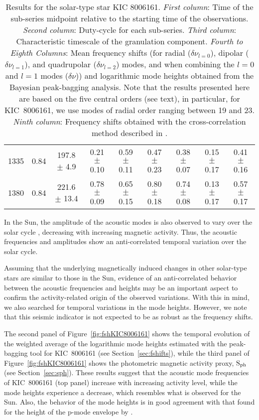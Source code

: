 \documentclass[twocolumn]{aastex61}%
\begin{document}
\begin{table*}
\begin{tabular}{ccc|ccccc|c}
1335 & 0.84 & 197.8 $\pm$ 4.9 & 0.21 $\pm$ 0.10 & 0.59 $\pm$ 0.11 & 0.47 $\pm$ 0.23 & 0.38 $\pm$ 0.07 & 0.15 $\pm$ 0.17 & 0.41 $\pm$ 0.16\\
1380 & 0.84 & 221.6 $\pm$ 13.4 & 0.78 $\pm$ 0.09 & 0.65 $\pm$ 0.15 & 0.80 $\pm$ 0.18 & 0.74 $\pm$ 0.08 & 0.13 $\pm$ 0.17 & 0.57 $\pm$ 0.17\\
\end{tabular}
\caption{Results for the solar-type star KIC 8006161. {\it First column}: Time of the sub-series midpoint relative to the starting time of the observations. {\it Second column}: Duty-cycle for each sub-series. {\it Third column}: Characteristic timescale of the granulation component. {\it Fourth to Eighth Columns}: Mean frequency shifts (for radial ($\delta\nu_{l=0}$), dipolar ($\delta\nu_{l=1}$), and quadrupolar ($\delta\nu_{l=2}$) modes, and when combining the $l=0$ and $l=1$ modes ($\delta\nu$)) and logarithmic mode heights obtained from the Bayesian peak-bagging analysis. Note that the results presented here are based on the five central orders (see text), in particular, for KIC~8006161, we use modes of radial order ranging between 19 and 23. {\it Ninth column}: Frequency shifts obtained with the cross-correlation method described in \citet{Kiefer2017}.}\label{tab:fshifts8006161}
\end{table*}

In the Sun, the amplitude of the acoustic modes is also observed to vary over the solar cycle \citep[e.g.][]{Elsworth1993,Chaplin2000,Salabert2006,Howe2015}, decreasing with increasing magnetic activity. Thus, the acoustic frequencies and amplitudes show an anti-correlated temporal variation over the solar cycle.

Assuming that the underlying magnetically induced changes in other solar-type stars are similar to those in the Sun, evidence of an anti-correlated behavior between the acoustic frequencies and heights may be an important aspect to confirm the activity-related origin of the observed variations. With this in mind, we also searched for temporal variations in the mode heights. However, we note that this seismic indicator is not expected to be as robust as the frequency shifts.

The second panel of Figure~\ref{fig:fshKIC8006161} shows the temporal evolution of the weighted average of the logarithmic mode heights estimated with the peak-bagging tool for KIC~8006161 (see Section~\ref{sec:fshifts}), while the third panel of Figure~\ref{fig:fshKIC8006161} shows the photometric magnetic activity proxy, ${\rm S}_{\rm ph}$ (see Section~\ref{sec:sph}). These results suggest that the acoustic mode frequencies of KIC~8006161 (top panel) increase with increasing activity level, while the mode heights experience a decrease, which resembles what is observed for the Sun. Also, the behavior of the mode heights is in good agreement with that found for the height of the p-mode envelope by \citet{Kiefer2017}.
\end{document}
